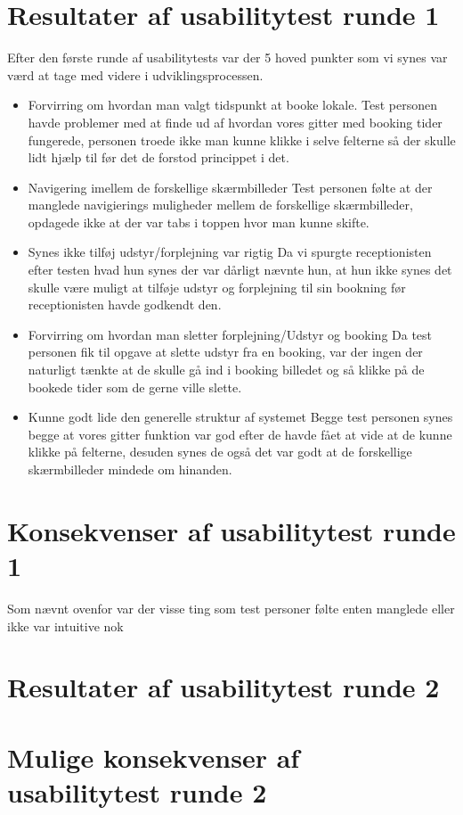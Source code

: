 \section{Resultater af usabilitytest runde 1 }
Efter den første runde af usabilitytests var der 5 hoved punkter som vi synes var værd at tage med videre i udviklingsprocessen.
\begin{itemize}
\item Forvirring om hvordan man valgt tidspunkt at booke lokale.
Test personen havde problemer med at finde ud af hvordan vores gitter med booking tider fungerede, personen troede ikke man kunne klikke i selve felterne så der skulle lidt hjælp til før det de forstod princippet i det.
\item Navigering imellem de forskellige skærmbilleder
Test personen følte at der manglede navigierings muligheder mellem de forskellige skærmbilleder, opdagede ikke at der var tabs i toppen hvor man kunne skifte.
\item Synes ikke tilføj udstyr/forplejning var rigtig
Da vi spurgte receptionisten efter testen hvad hun synes der var dårligt nævnte hun, at hun ikke synes det skulle være muligt at tilføje udstyr og forplejning til sin bookning før receptionisten havde godkendt den. 
\item Forvirring om hvordan man sletter forplejning/Udstyr og booking
Da test personen fik til opgave at slette udstyr fra en booking, var der ingen der naturligt tænkte at de skulle gå ind i booking billedet og så klikke på de bookede tider som de gerne ville slette.
\item Kunne godt lide den generelle struktur af systemet
Begge test personen synes begge at vores gitter funktion var god efter de havde fået at vide at de kunne klikke på felterne, desuden synes de også det var godt at de forskellige skærmbilleder mindede om hinanden.
\end{itemize}

\section{Konsekvenser af usabilitytest runde 1}
Som nævnt ovenfor var der visse ting som test personer følte enten manglede eller ikke var intuitive nok

\section{Resultater af usabilitytest runde 2}
\section{Mulige konsekvenser af usabilitytest runde 2}